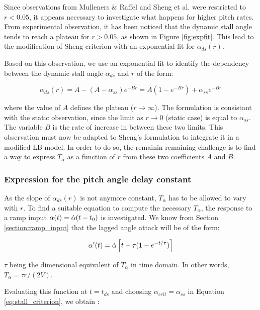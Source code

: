 Since observations from Mulleners \& Raffel \cite{mulleners_onset_2010,mulleners_onset_2012,mulleners_dynamic_2013} and Sheng et al. \cite{sheng_new_2006,sheng_modified_2008} were restricted to $r<0.05$, it appears necessary to investigate what happens for higher pitch rates. From experimental observation, it has been noticed that the dynamic stall angle tends to reach a plateau for $r>0.05$, as shown in Figure  \ref{fig:expfit}. This lead to the modification of Sheng criterion with an exponential fit for $\alpha_{ds}(r)$.

Based on this observation, we use an exponential fit to identify the dependency between the dynamic stall angle $\alpha_{ds}$ and $r$ of the form: 

\begin{equation}
\alpha_{ds}(r) = A-(A-\alpha_{ss})e^{-Br} = A(1-e^{-Br})+\alpha_{ss}e^{-Br}
\label{eq:alpha_ds_r}
\end{equation}

\noindent where the value of $A$ defines the plateau ($r \rightarrow \infty$). The formulation is consistant with the static observation, since the limit as $r \rightarrow 0$ (static case) is equal to $\alpha_{ss}$. The variable $B$ is the rate of increase in between these two limits. This observation must now be adapted to Sheng's formulation to integrate it in a modified LB model. In order to do so, the remainin remaining challenge is to find a way to express $T_\alpha$ as a function of $r$ from these two coefficients $A$ and $B$.

\subsubsection{Expression for the pitch angle delay constant}
As the slope of $\alpha_{ds}(r)$ is not anymore constant, $T_\alpha$ has to be allowed to vary with $r$. To find a suitable equation to compute the necessary $T_{\alpha}$, the response to a ramp imput $\alpha(t) = \dot{\alpha}(t-t_0)$ is investigated. 
We know from Section \ref{section:ramp_input} that the lagged angle attack will be of the form:

\begin{equation}
\alpha'(t) = \dot{\alpha}\left[t- \tau(1-e^{-t/ \tau})\right]
\end{equation}

\noindent $\tau$ being the dimensional equivalent of $T_\alpha$ in time domain. In other words, $T_\alpha = \tau c/(2V)$.

Evaluating this function at $t=t_{ds}$ and choosing $\alpha_{crit}=\alpha_{ss}$ in Equation \eqref{eq:stall_criterion}, we obtain : 

